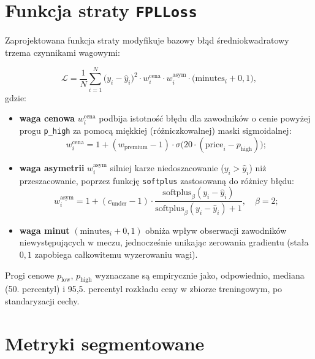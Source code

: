 \documentclass[a4paper,twoside,11pt]{mwrep}
\theoremstyle{plain} \newtheorem{thm}{Twierdzenie}
\theoremstyle{plain} \newtheorem{lem}{Lemat}
\theoremstyle{definition} \newtheorem{defn}{Definicja}
\theoremstyle{remark} \newtheorem*{rem}{Wniosek}
\begin{document}
\section{Funkcja straty \texttt{FPLLoss}}

Zaprojektowana funkcja straty modyfikuje bazowy błąd średniokwadratowy
trzema czynnikami wagowymi:

\begin{equation}
    \mathcal{L} = \frac{1}{N}\sum_{i=1}^{N} \big(y_i - \hat{y}_i\big)^2 \cdot w^{\text{cena}}_i \cdot w^{\text{asym}}_i \cdot \big(\text{minutes}_i + 0{,}1\big),
\end{equation}
gdzie:
\begin{itemize}
    \item \textbf{waga cenowa} $w^{\text{cena}}_i$ podbija istotność błędu
    dla zawodników o cenie powyżej progu \texttt{p\_high} za pomocą miękkiej
    (różniczkowalnej) maski sigmoidalnej:
    \begin{equation}
        w^{\text{cena}}_i = 1 + (w_{\text{premium}}-1)\cdot \sigma\!\big(20\cdot(\text{price}_i - p_{\text{high}})\big);
    \end{equation}
    \item \textbf{waga asymetrii} $w^{\text{asym}}_i$ silniej karze
    niedoszacowanie ($y_i > \hat{y}_i$) niż przeszacowanie, poprzez funkcję
    \texttt{softplus} zastosowaną do różnicy błędu:
    \begin{equation}
        w^{\text{asym}}_i = 1 + (c_{\text{under}}-1)\cdot \frac{\text{softplus}_\beta(y_i-\hat{y}_i)}{\text{softplus}_\beta(y_i-\hat{y}_i)+1}, \quad \beta=2;
    \end{equation}
    \item \textbf{waga minut} $(\text{minutes}_i+0{,}1)$ obniża wpływ
    obserwacji zawodników niewystępujących w meczu, jednocześnie unikając
    zerowania gradientu (stała $0{,}1$ zapobiega całkowitemu wyzerowaniu
    wagi).
\end{itemize}

Progi cenowe $p_{\text{low}}$, $p_{\text{high}}$ wyznaczane są empirycznie
jako, odpowiednio, mediana (50. percentyl) i 95,5. percentyl rozkładu ceny
w zbiorze treningowym, po standaryzacji cechy.

\section{Metryki segmentowane}
\end{document}
